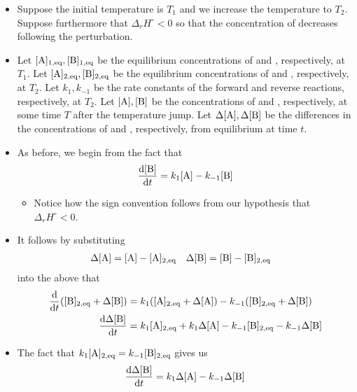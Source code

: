 \documentclass[../notes.tex]{subfiles}
\begin{document}
\begin{itemize}
\begin{itemize}
        \item Suppose the initial temperature is $T_1$ and we increase the temperature to $T_2$. Suppose furthermore that $\Delta_rH^\circ<0$ so that the concentration of  decreases following the perturbation.
        \item Let $[\ce{A}]_{1,\text{eq}},[\ce{B}]_{1,\text{eq}}$ be the equilibrium concentrations of  and , respectively, at $T_1$. Let $[\ce{A}]_{2,\text{eq}},[\ce{B}]_{2,\text{eq}}$ be the equilibrium concentrations of  and , respectively, at $T_2$. Let $k_1,k_{-1}$ be the rate constants of the forward and reverse reactions, respectively, at $T_2$. Let $[\ce{A}],[\ce{B}]$ be the concentrations of  and , respectively, at some time $T$ after the temperature jump. Let $\Delta[\ce{A}],\Delta[\ce{B}]$ be the differences in the concentrations of  and , respectively, from equilibrium at time $t$.
        \item As before, we begin from the fact that
        \begin{equation*}
            \dv{[\ce{B}]}{t} = k_1[\ce{A}]-k_{-1}[\ce{B}]
        \end{equation*}
        \begin{itemize}
            \item Notice how the sign convention follows from our hypothesis that $\Delta_rH^\circ<0$.
        \end{itemize}
        \item It follows by substituting
        \begin{align*}
            \Delta[\ce{A}] &= [\ce{A}]-[\ce{A}]_{2,\text{eq}}&
            \Delta[\ce{B}] &= [\ce{B}]-[\ce{B}]_{2,\text{eq}}
        \end{align*}
        into the above that
        \begin{align*}
            \dv{t}([\ce{B}]_{2,\text{eq}}+\Delta[\ce{B}]) &= k_1([\ce{A}]_{2,\text{eq}}+\Delta[\ce{A}])-k_{-1}([\ce{B}]_{2,\text{eq}}+\Delta[\ce{B}])\\
            \dv{\Delta[\ce{B}]}{t} &= k_1[\ce{A}]_{2,\text{eq}}+k_1\Delta[\ce{A}]-k_{-1}[\ce{B}]_{2,\text{eq}}-k_{-1}\Delta[\ce{B}]
        \end{align*}
        \item The fact that $k_1[\ce{A}]_{2,\text{eq}}=k_{-1}[\ce{B}]_{2,\text{eq}}$ gives us
        \begin{equation*}
            \dv{\Delta[\ce{B}]}{t} = k_1\Delta[\ce{A}]-k_{-1}\Delta[\ce{B}]
        \end{equation*}

\end{itemize}
\end{itemize}
\end{document}
